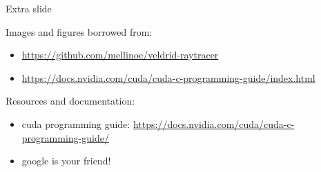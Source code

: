 \documentclass[11pt,t]{beamer}
\begin{document}
\appendix
\begin{frame}[noframenumbering,label=extraframe]{Extra slide}


\begin{footnotesize}

Images and figures borrowed from:

\begin{itemize}
    \item \url{https://github.com/mellinoe/veldrid-raytracer}
    \item \url{https://docs.nvidia.com/cuda/cuda-c-programming-guide/index.html}
\end{itemize}

Resources and documentation:
\begin{itemize}
    \item cuda programming guide: \url{https://docs.nvidia.com/cuda/cuda-c-programming-guide/}
    \item google is your friend!
\end{itemize}

\end{footnotesize}


\end{frame}
\end{document}
